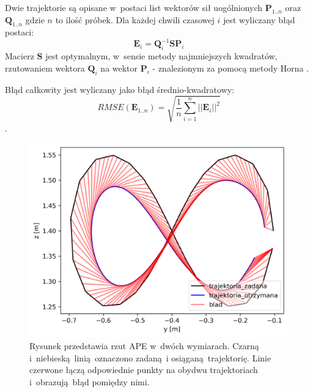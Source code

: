 Dwie trajektorie są opisane w~postaci list wektorów sił uogólnionych $\boldsymbol{P}_{1..n}$ oraz $\boldsymbol{Q}_{1..n}$ gdzie $n$ to ilość próbek. Dla każdej chwili czasowej $i$ jest wyliczany błąd postaci:
\begin{equation}
\boldsymbol{E}_i = \boldsymbol{Q}_i^{-1}\boldsymbol{S}\boldsymbol{P}_i
\end{equation}
Macierz $\boldsymbol{S}$ jest optymalnym, w~sensie metody najmniejszych kwadratów, rzutowaniem wektora $\boldsymbol{Q}_i$ na wektor $\boldsymbol{P}_i$ - znalezionym za pomocą metody Horna \cite{bib:horn}. 

Błąd całkowity jest wyliczany jako błąd średnio-kwadratowy:
\begin{equation}
RMSE(\boldsymbol{E}_{1..n}) = \sqrt{\frac{1}{n}\sum_{i=1}^{n}||\boldsymbol{E}_i||^2}
\end{equation}.



\begin{figure}
	\centering
		\includegraphics[width=.45\textwidth]{./velma/przerobione_testy/out/osemka/yz_ate_plot_podnoszenie_miekki_bez_brak.png}
		\caption{Rysunek przedstawia rzut APE w~dwóch wymiarach. Czarną i~niebieską linią oznaczono zadaną i osiąganą trajektorię. Linie czerwone łączą odpowiednie punkty na obydwu trajektoriach i~obrazują błąd pomiędzy nimi.}
		\label{fig:przykl_ape}
\end{figure}





